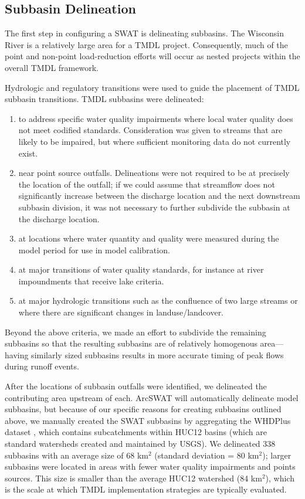 \subsection{Subbasin Delineation}\label{sec:sub_delineation}
The first step in configuring a SWAT is delineating subbasins. The Wisconsin River is a relatively large area for a TMDL project. Consequently, much of the point and non-point load-reduction efforts will occur as nested projects within the overall TMDL framework.

Hydrologic and regulatory transitions were used to guide the placement of TMDL subbasin transitions. TMDL subbasins were delineated: 
\begin{enumerate}
	\item to address specific water quality impairments where local water quality does not meet codified standards. Consideration was given to streams that are likely to be impaired, but where sufficient monitoring data do not currently exist.
	\item near point source outfalls. Delineations were not required to be at precisely the location of the outfall; if we could assume that streamflow does not significantly increase between the discharge location and the next downstream subbasin division, it was not necessary to further subdivide the subbasin at the discharge location.
	\item at locations where water quantity and quality were measured during the model period for use in model calibration.
	\item at major transitions of water quality standards, for instance at river impoundments that receive lake criteria.
	\item at major hydrologic transitions such as the confluence of two large streams or where there are significant changes in landuse/landcover.
\end{enumerate}

Beyond the above criteria, we made an effort to subdivide the remaining subbasins so that the resulting subbasins are of relatively homogenous area---having similarly sized subbasins results in more accurate timing of peak flows during runoff events.

After the locations of subbasin outfalls were identified, we delineated the contributing area upstream of each.
ArcSWAT will automatically delineate model subbasins, but because of our specific reasons for creating subbasins outlined above, we manually created the SWAT subbasins by aggregating the WHDPlus dataset \citep{wdnr_whdplus_2013}, which contains subcatchments within HUC12 basins (which are standard watersheds created and maintained by USGS). 
We delineated 338 subbasins with an average size of 68 km$^2$ (standard deviation = 80 km$^2$); larger subbasins were located in areas with fewer water quality impairments and points sources. This size is smaller than the average HUC12 watershed (84 km$^2$), which is the scale at which TMDL implementation strategies are typically evaluated.